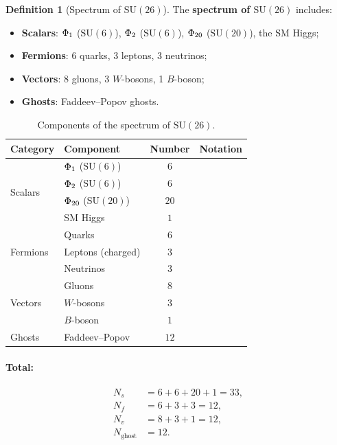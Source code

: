 \documentclass[11pt,a4paper]{article}
\newcommand{\SU}{\mathrm{SU}}
\newcommand{\Phione}{\Phi\textsubscript{1}}
\newcommand{\Phitwo}{\Phi\textsubscript{2}}
\newcommand{\Phitwenty}{\Phi\textsubscript{20}}
\theoremstyle{definition}
\newtheorem{definition}[theorem]{Definition}
\begin{document}
\begin{definition}[Spectrum of $\SU(26)$]
\label{def:su26-spectrum}
The \textbf{spectrum of $\SU(26)$} includes:
\begin{itemize}
    \item \textbf{Scalars}: $\Phione$ ($\SU(6)$), $\Phitwo$ ($\SU(6)$), 
          $\Phitwenty$ ($\SU(20)$), the SM Higgs;
    \item \textbf{Fermions}: 6 quarks, 3 leptons, 3 neutrinos;
    \item \textbf{Vectors}: 8 gluons, 3 $W$-bosons, 1 $B$-boson;
    \item \textbf{Ghosts}: Faddeev--Popov ghosts.
\end{itemize}
\end{definition}

\begin{table}[htbp]
\centering
\caption{Components of the spectrum of $\SU(26)$.}
\label{tab:su26-spectrum}
\begin{tabular}{llcl}
\toprule
Category & Component & Number & Notation \\
\midrule
\multirow{4}{*}{Scalars}
    & $\Phione$ ($\SU(6)$) & $6$ & \\
    & $\Phitwo$ ($\SU(6)$) & $6$ & \\
    & $\Phitwenty$ ($\SU(20)$) & $20$ & \\
    & SM Higgs & $1$ & \\
\midrule
\multirow{3}{*}{Fermions}
    & Quarks & $6$ & \\
    & Leptons (charged) & $3$ & \\
    & Neutrinos & $3$ & \\
\midrule
\multirow{3}{*}{Vectors}
    & Gluons & $8$ & \\
    & $W$-bosons & $3$ & \\
    & $B$-boson & $1$ & \\
\midrule
Ghosts & Faddeev--Popov & $12$ & \\
\bottomrule
\end{tabular}
\end{table}

\paragraph{Total:}
\begin{align}
    N_s &= 6 + 6 + 20 + 1 = 33, \\
    N_f &= 6 + 3 + 3 = 12, \\
    N_v &= 8 + 3 + 1 = 12, \\
    N_{\text{ghost}} &= 12.
\end{align}
\end{document}
